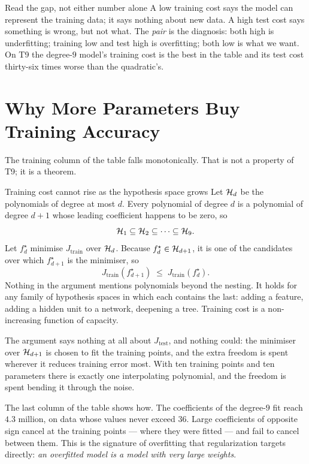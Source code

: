 \begin{keyinsight}{Read the gap, not either number alone}
A low training cost says the model can represent the training data; it says
nothing about new data. A high test cost says something is wrong, but not what.
The \emph{pair} is the diagnosis: both high is underfitting; training low and
test high is overfitting; both low is what we want. On T9 the degree-$9$ model's
training cost is the best in the table and its test cost thirty-six times worse
than the quadratic's.
\end{keyinsight}

\section{Why More Parameters Buy Training Accuracy}
\label{sec:nested}

The training column of the table falls monotonically. That is not a property of
T9; it is a theorem.

\begin{derivation}{Training cost cannot rise as the hypothesis space grows}
Let $\mathcal{H}_d$ be the polynomials of degree at most $d$. Every polynomial of
degree $d$ is a polynomial of degree $d+1$ whose leading coefficient happens to
be zero, so
\[
  \mathcal{H}_1 \subseteq \mathcal{H}_2 \subseteq \cdots \subseteq \mathcal{H}_9 .
\]
Let $f_d^\star$ minimise $J_{\text{train}}$ over $\mathcal{H}_d$. Because
$f_d^\star \in \mathcal{H}_{d+1}$, it is one of the candidates over which
$f_{d+1}^\star$ is the minimiser, so
\[
  J_{\text{train}}(f_{d+1}^\star) \;\le\; J_{\text{train}}(f_d^\star).
\]
Nothing in the argument mentions polynomials beyond the nesting. It holds for
any family of hypothesis spaces in which each contains the last: adding a
feature, adding a hidden unit to a network, deepening a tree. Training cost is a
non-increasing function of capacity.
\end{derivation}

The argument says nothing at all about $J_{\text{test}}$, and nothing could: the
minimiser over $\mathcal{H}_{d+1}$ is chosen to fit the training points, and the
extra freedom is spent wherever it reduces training error most. With ten
training points and ten parameters there is exactly one interpolating
polynomial, and the freedom is spent bending it through the noise.

The last column of the table shows how. The coefficients of the degree-$9$ fit
reach $4.3$ million, on data whose values never exceed $36$. Large coefficients
of opposite sign cancel at the training points --- where they were fitted ---
and fail to cancel between them. This is the signature of overfitting that
regularization targets directly: \emph{an overfitted model is a model with very
large weights}.

